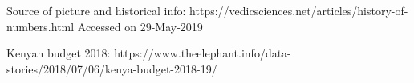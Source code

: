 Source of picture and historical info: https://vedicsciences.net/articles/history-of-numbers.html 
Accessed on 29-May-2019

Kenyan budget 2018: https://www.theelephant.info/data-stories/2018/07/06/kenya-budget-2018-19/

